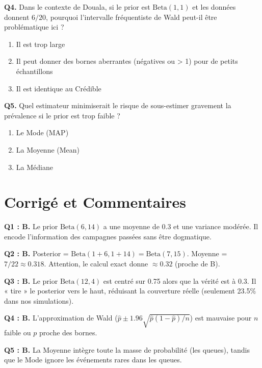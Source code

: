 \documentclass[11pt,a4paper]{article}
\begin{document}
\begin{qcmbox}
\textbf{Q4.} Dans le contexte de Douala, si le prior est $\text{Beta}(1,1)$ et les données donnent $6/20$, pourquoi l'intervalle fréquentiste de Wald peut-il être problématique ici ?
\begin{enumerate}[label=\Alph*.)]
    \item Il est trop large
    \item Il peut donner des bornes aberrantes (négatives ou > 1) pour de petits échantillons
    \item Il est identique au Crédible
\end{enumerate}

\textbf{Q5.} Quel estimateur minimiserait le risque de sous-estimer gravement la prévalence si le prior est trop faible ?
\begin{enumerate}[label=\Alph*.)]
    \item Le Mode (MAP)
    \item La Moyenne (Mean)
    \item La Médiane
\end{enumerate}
\end{qcmbox}

\section{Corrigé et Commentaires}
\begin{corrigebox}[Solutions]
\textbf{Q1 : B.} Le prior $\text{Beta}(6,14)$ a une moyenne de 0.3 et une variance modérée. Il encode l'information des campagnes passées sans être dogmatique.

\textbf{Q2 : B.} Posterior = $\text{Beta}(1+6, 1+14) = \text{Beta}(7, 15)$. Moyenne = $7/22 \approx 0.318$. Attention, le calcul exact donne $\approx 0.32$ (proche de B).

\textbf{Q3 : B.} Le prior $\text{Beta}(12,4)$ est centré sur 0.75 alors que la vérité est à 0.3. Il « tire » le posterior vers le haut, réduisant la couverture réelle (seulement 23.5\% dans nos simulations).

\textbf{Q4 : B.} L'approximation de Wald ($\hat{p} \pm 1.96\sqrt{\hat{p}(1-\hat{p})/n}$) est mauvaise pour $n$ faible ou $p$ proche des bornes.

\textbf{Q5 : B.} La Moyenne intègre toute la masse de probabilité (les queues), tandis que le Mode ignore les événements rares dans les queues.
\end{corrigebox}
\end{document}
